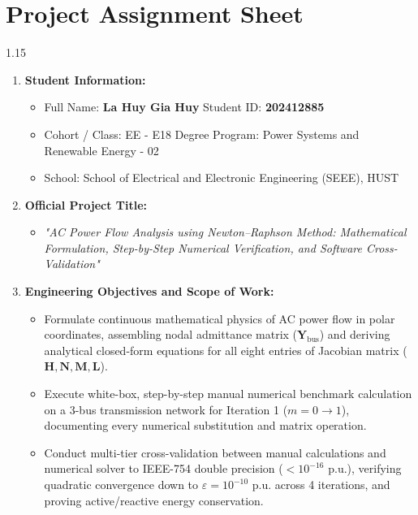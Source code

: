 \documentclass[12pt,a4paper,oneside]{report}
\begin{document}
\chapter*{Project Assignment Sheet}

\begin{spacing}{1.15}
\begin{enumerate}\setlength{\itemsep}{1.5pt}\setlength{\parskip}{0pt}
    \item \textbf{Student Information:}
    \begin{itemize}\setlength{\itemsep}{0.5pt}\setlength{\parskip}{0pt}
        \item Full Name: \textbf{La Huy Gia Huy} \quad Student ID: \textbf{202412885}
        \item Cohort / Class: EE - E18 \quad Degree Program: Power Systems and Renewable Energy - 02
        \item School: School of Electrical and Electronic Engineering (SEEE), HUST
    \end{itemize}
    \item \textbf{Official Project Title:}
    \begin{itemize}\setlength{\itemsep}{0.5pt}\setlength{\parskip}{0pt}
        \item \textit{"AC Power Flow Analysis using Newton--Raphson Method: Mathematical Formulation, Step-by-Step Numerical Verification, and Software Cross-Validation"}
    \end{itemize}
    \item \textbf{Engineering Objectives and Scope of Work:}
    \begin{itemize}\setlength{\itemsep}{0.5pt}\setlength{\parskip}{0pt}
        \item Formulate continuous mathematical physics of AC power flow in polar coordinates, assembling nodal admittance matrix ($\mathbf{Y}_{\text{bus}}$) and deriving analytical closed-form equations for all eight entries of Jacobian matrix ($\mathbf{H}, \mathbf{N}, \mathbf{M}, \mathbf{L}$).
        \item Execute white-box, step-by-step manual numerical benchmark calculation on a 3-bus transmission network for Iteration 1 ($m = 0 \to 1$), documenting every numerical substitution and matrix operation.
        \item Conduct multi-tier cross-validation between manual calculations and numerical solver to IEEE-754 double precision ($< 10^{-16}\text{ p.u.}$), verifying quadratic convergence down to $\varepsilon = 10^{-10}\text{ p.u.}$ across 4 iterations, and proving active/reactive energy conservation.

\end{itemize}
\end{enumerate}
\end{spacing}
\end{document}
